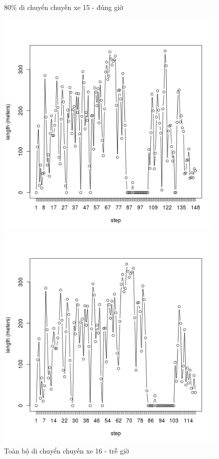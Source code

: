\documentclass[a4paper, 13pt]{report}
\begin{document}
\begin{figure}[!htb]
  \caption*{80\% di chuyển chuyến xe 15 - đúng giờ}
\endminipage
{}%
  \includegraphics[width=\linewidth]{test_100_16}
  \caption*{Toàn bộ di chuyển chuyến xe 16 - trễ giờ}
\endminipage
{}
  \includegraphics[width=\linewidth]{test_80_16}

\end{figure}
\end{document}
